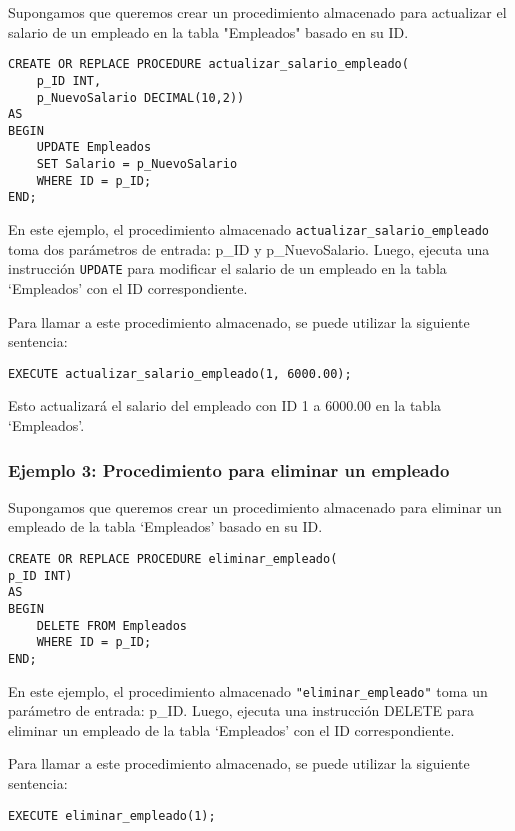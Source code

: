 \documentclass[executivepaper]{article}
\begin{document}
Supongamos que queremos crear un procedimiento almacenado para actualizar el salario de un empleado en la tabla "Empleados" basado en su ID.

\begin{lstlisting}
CREATE OR REPLACE PROCEDURE actualizar_salario_empleado(
    p_ID INT,
    p_NuevoSalario DECIMAL(10,2))
AS
BEGIN
    UPDATE Empleados
    SET Salario = p_NuevoSalario
    WHERE ID = p_ID;
END;
\end{lstlisting}

En este ejemplo, el procedimiento almacenado \lstinline{actualizar_salario_empleado} toma dos parámetros de entrada: p\_ID y p\_NuevoSalario. Luego, ejecuta una instrucción \lstinline{UPDATE} para modificar el salario de un empleado en la tabla \enquote*{Empleados} con el ID correspondiente.

Para llamar a este procedimiento almacenado, se puede utilizar la siguiente sentencia:

\begin{lstlisting}
EXECUTE actualizar_salario_empleado(1, 6000.00);
\end{lstlisting}

Esto actualizará el salario del empleado con ID 1 a 6000.00 en la tabla \enquote*{Empleados}.

\subsubsection*{Ejemplo 3: Procedimiento para eliminar un empleado}

Supongamos que queremos crear un procedimiento almacenado para eliminar un empleado de la tabla \enquote*{Empleados} basado en su ID.

\begin{lstlisting}
CREATE OR REPLACE PROCEDURE eliminar_empleado(
p_ID INT)
AS
BEGIN
    DELETE FROM Empleados
    WHERE ID = p_ID;
END;
\end{lstlisting}

En este ejemplo, el procedimiento almacenado \lstinline{"eliminar_empleado"} toma un parámetro de entrada: p\_ID. Luego, ejecuta una instrucción DELETE para eliminar un empleado de la tabla \enquote*{Empleados} con el ID correspondiente.

Para llamar a este procedimiento almacenado, se puede utilizar la siguiente sentencia:

\begin{lstlisting}
EXECUTE eliminar_empleado(1);
\end{lstlisting}
\end{document}
